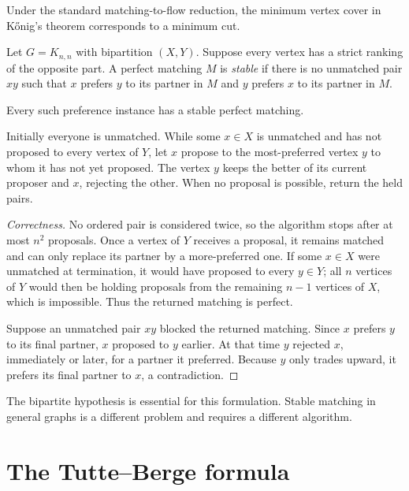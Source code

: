 \begin{noteremark}
Under the standard matching-to-flow reduction, the minimum vertex cover in
K\H{o}nig's theorem corresponds to a minimum cut.
\end{noteremark}
\begin{notedefinition}
Let $G=K_{n,n}$ with bipartition $(X,Y)$.  Suppose every vertex has a strict
ranking of the opposite part.  A perfect matching $M$ is \emph{stable} if
there is no unmatched pair $xy$ such that $x$ prefers $y$ to its partner in
$M$ and $y$ prefers $x$ to its partner in $M$.
\end{notedefinition}

\begin{notetheorem}
Every such preference instance has a stable perfect matching.
\end{notetheorem}

\begin{notealgorithm}
Initially everyone is unmatched.  While some $x\in X$ is unmatched and has
not proposed to every vertex of $Y$, let $x$ propose to the most-preferred
vertex $y$ to whom it has not yet proposed.  The vertex $y$ keeps the better
of its current proposer and $x$, rejecting the other.  When no proposal is
possible, return the held pairs.
\end{notealgorithm}
\begin{proof}[Correctness]
No ordered pair is considered twice, so the algorithm stops after at most
$n^2$ proposals.  Once a vertex of $Y$ receives a proposal, it remains matched
and can only replace its partner by a more-preferred one.  If some $x\in X$
were unmatched at termination, it would have proposed to every $y\in Y$; all
$n$ vertices of $Y$ would then be holding proposals from the remaining
$n-1$ vertices of $X$, which is impossible.  Thus the returned matching is
perfect.

Suppose an unmatched pair $xy$ blocked the returned matching.  Since $x$
prefers $y$ to its final partner, $x$ proposed to $y$ earlier.  At that time
$y$ rejected $x$, immediately or later, for a partner it preferred.  Because
$y$ only trades upward, it prefers its final partner to $x$, a contradiction.
\end{proof}
\begin{noteremark}
The bipartite hypothesis is essential for this formulation.  Stable matching
in general graphs is a different problem and requires a different algorithm.
\end{noteremark}
\section{The Tutte--Berge formula}


